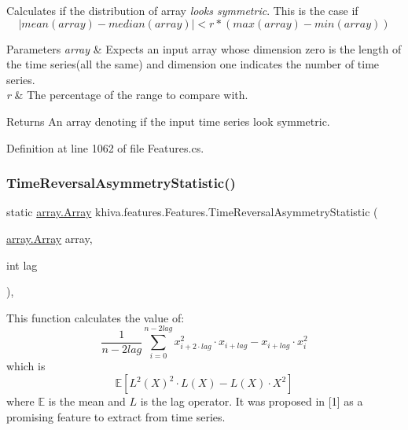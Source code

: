 Calculates if the distribution of array {\itshape looks symmetric}. This is the case if \[ | mean(array) - median(array) | \lt r * (max(array) - min(array)) \] 


\begin{DoxyParams}{Parameters}
{\em array} & Expects an input array whose dimension zero is the length of the time series(all the same) and dimension one indicates the number of time series.\\
\hline
{\em r} & The percentage of the range to compare with.\\
\hline
\end{DoxyParams}
\begin{DoxyReturn}{Returns}
An array denoting if the input time series look symmetric.
\end{DoxyReturn}


Definition at line 1062 of file Features.\+cs.

\mbox{\label{classkhiva_1_1features_1_1_features_afee3c3d5d23ffc2085e9cdeb369e8bf6}} 
\subsubsection{\texorpdfstring{Time\+Reversal\+Asymmetry\+Statistic()}{TimeReversalAsymmetryStatistic()}}
{\footnotesize\ttfamily static \mbox{\hyperlink{classkhiva_1_1array_1_1_array}{array.\+Array}} khiva.\+features.\+Features.\+Time\+Reversal\+Asymmetry\+Statistic (\begin{DoxyParamCaption}\item[{\mbox{\hyperlink{classkhiva_1_1array_1_1_array}{array.\+Array}}}]{array,  }\item[{int}]{lag }\end{DoxyParamCaption})\hspace{0.3cm}{\ttfamily [inline]}, {\ttfamily [static]}}



This function calculates the value of\+: \[ \frac{1}{n-2lag} \sum_{i=0}^{n-2lag} x_{i + 2 \cdot lag}^2 \cdot x_ { i + lag } - x_{i + lag} \cdot x_ { i }^2 \] which is \[ \mathbb{E}[L^2(X)^2 \cdot L(X) - L(X) \cdot X^2] \] where $ \mathbb{E} $ is the mean and $ L $ is the lag operator. It was proposed in \mbox{[}1\mbox{]} as a promising feature to extract from time series. 

